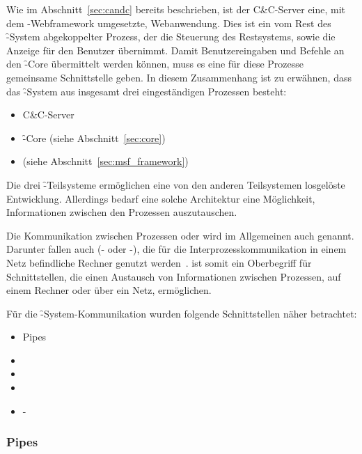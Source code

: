 Wie im Abschnitt~\ref{sec:candc} bereits beschrieben, ist
der C\&C-Server eine, mit dem -Webframework umgesetzte,
Webanwendung. Dies ist ein vom Rest des \f-System abgekoppelter
Prozess, der die Steuerung des Restsystems, sowie die Anzeige für den
Benutzer übernimmt. Damit Benutzereingaben und Befehle an den \f-Core
übermittelt werden können, muss es eine für diese Prozesse gemeinsame
Schnittstelle geben. In diesem Zusammenhang ist zu erwähnen, dass das
\f-System aus insgesamt drei eingeständigen Prozessen besteht:

\begin{itemize}
  \item C\&C-Server
  \item \f-Core (siehe Abschnitt~\ref{sec:core})
  \item {} (siehe Abschnitt~\ref{sec:msf_framework})
\end{itemize}

Die drei \f-Teilsysteme ermöglichen eine von den anderen Teilsystemen
losgelöste Entwicklung. Allerdings bedarf eine solche Architektur eine
Möglichkeit, Informationen zwischen den Prozessen auszutauschen.

Die Kommunikation zwischen Prozessen oder  wird im Allgemeinen
auch  genannt. Darunter fallen auch 
(- oder -), die für die
Interprozesskommunikation in einem Netz befindliche Rechner genutzt
werden~\cite{Stevens:716026}.  ist somit ein Oberbegriff für
Schnittstellen, die einen Austausch von Informationen zwischen Prozessen, auf
einem Rechner oder über ein Netz, ermöglichen.

Für die \f-System-Kommunikation wurden folgende Schnittstellen näher betrachtet:

\begin{itemize}
  \item Pipes
  \item {}
  \item {}
  \item {}
  \item {}-
\end{itemize}

\subsubsection*{Pipes}

